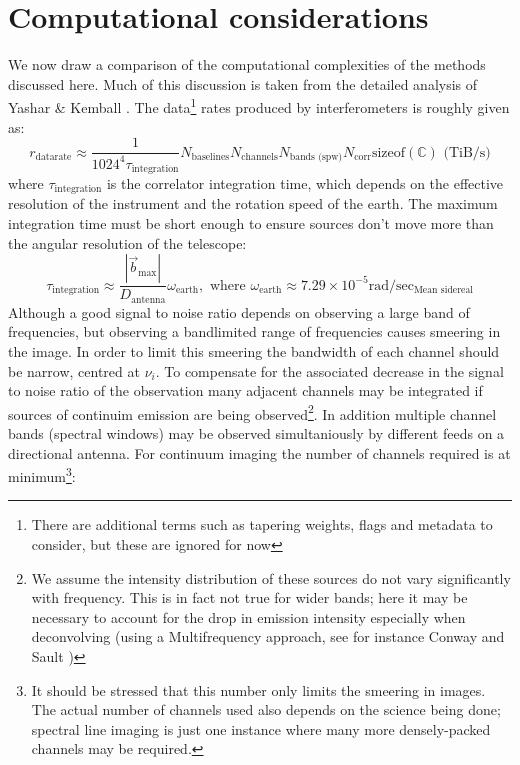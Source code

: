 \section{Computational considerations}
We now draw a comparison of the computational complexities of the methods discussed here. Much of this discussion is taken from the detailed analysis of 
Yashar \& Kemball \cite{yashar2009tdp}.
The data\footnote{There are additional terms such as tapering weights, flags and metadata to consider, but these are ignored for now} rates produced by interferometers is roughly given as:
\begin{equation}
 r_\text{datarate} \approx \frac{1}{1024^4\tau_{\text{integration}}}N_{\text{baselines}}N_{\text{channels}}N_{\text{bands (spw)}}N_{\text{corr}}\text{sizeof}(\mathbb{C})\text{ (TiB/s)}
\end{equation}
where $\tau_{\text{integration}}$ is the correlator integration time, which depends on the effective resolution of the instrument and the rotation speed of the earth.
The maximum integration time must be short enough to ensure sources don't move more than the angular resolution of the telescope:
\begin{equation}
 \tau_{\text{integration}} \approx \frac{|\vec{b}_{\text{max}}|}{D_{\text{antenna}}}\omega_\text{earth},\text{ where } \omega_\text{earth}\approx 7.29\times10^{-5}\text{rad}/\text{sec}_\text{Mean sidereal}
\end{equation}
Although a good signal to noise ratio depends on observing a large band of frequencies, but observing a bandlimited range of frequencies causes smeering in the image. In order to limit this smeering
the bandwidth of each channel should be narrow, centred at $\nu_i$. To compensate for the associated decrease in the signal to noise ratio of the observation many adjacent channels may be integrated if 
sources of continuim emission are being observed\footnote{We assume the intensity distribution of these sources do not vary significantly with frequency. This is in fact not true for wider bands; here 
it may be necessary to account for the drop in emission intensity especially when deconvolving (using a Multifrequency approach, see for instance Conway and Sault \cite[Lecture 21]{taylor1999synthesis})}. In addition 
multiple channel bands (spectral windows) may be observed simultaniously by different feeds on a directional antenna. For continuum imaging the number of channels required is at minimum\footnote{It should 
be stressed that this number only limits the smeering in images. The actual number of channels used also depends on the science being done; spectral line imaging is just one instance where many more 
densely-packed channels may be required.}:
